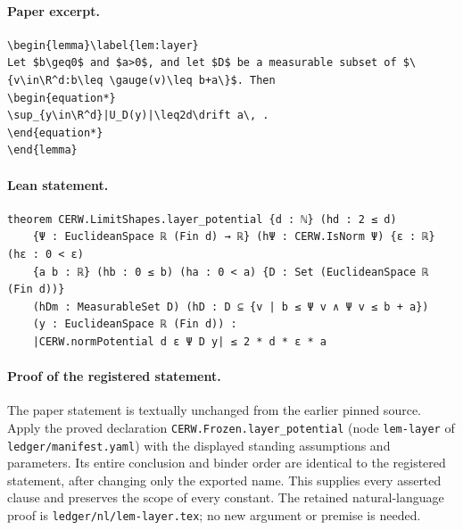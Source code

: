 \paragraph{Paper excerpt.}
\begin{verbatim}
\begin{lemma}\label{lem:layer}
Let $b\geq0$ and $a>0$, and let $D$ be a measurable subset of $\{v\in\R^d:b\leq \gauge(v)\leq b+a\}$. Then
\begin{equation*}
\sup_{y\in\R^d}|U_D(y)|\leq2d\drift a\, .
\end{equation*}
\end{lemma}
\end{verbatim}
\paragraph{Lean statement.}
\begin{verbatim}
theorem CERW.LimitShapes.layer_potential {d : ℕ} (hd : 2 ≤ d)
    {Ψ : EuclideanSpace ℝ (Fin d) → ℝ} (hΨ : CERW.IsNorm Ψ) {ε : ℝ} (hε : 0 < ε)
    {a b : ℝ} (hb : 0 ≤ b) (ha : 0 < a) {D : Set (EuclideanSpace ℝ (Fin d))}
    (hDm : MeasurableSet D) (hD : D ⊆ {v | b ≤ Ψ v ∧ Ψ v ≤ b + a})
    (y : EuclideanSpace ℝ (Fin d)) :
    |CERW.normPotential d ε Ψ D y| ≤ 2 * d * ε * a
\end{verbatim}
\paragraph{Proof of the registered statement.}
The paper statement is textually unchanged from the earlier pinned source.
Apply the proved declaration \texttt{CERW.Frozen.layer\_potential}
(node \texttt{lem-layer} of \texttt{ledger/manifest.yaml}) with the displayed
standing assumptions and parameters. Its entire conclusion and binder order
are identical to the registered statement, after changing only the exported
name. This supplies every asserted clause and preserves the scope of every
constant. The retained natural-language proof is
\texttt{ledger/nl/lem-layer.tex}; no new argument or premise is needed.

